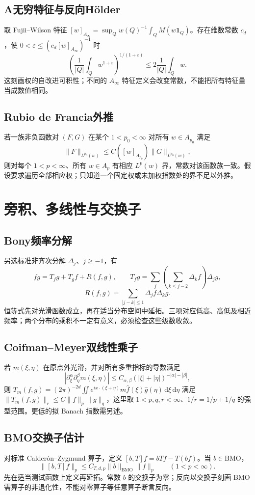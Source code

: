 \documentclass[../main.tex]{subfiles}
\begin{document}
\subsection{A无穷特征与反向Hölder}
取 Fujii--Wilson 特征 $[w]_{A_\infty}=\sup_Qw(Q)^{-1}\int_QM(w\bm1_Q)$。存在维数常数 $c_d$，使 $0<\varepsilon\le(c_d[w]_{A_\infty})^{-1}$ 时
\[
\left(\frac1{|Q|}\int_Qw^{1+\varepsilon}\right)^{1/(1+\varepsilon)}
\le2\frac1{|Q|}\int_Qw.
\]
这刻画权的自改进可积性；不同的 $A_\infty$ 特征定义会改变常数，不能把所有特征量当成数值相同。
\subsection{Rubio de Francia外推}
若一族非负函数对 $(F,G)$ 在某个 $1<p_0<\infty$ 对所有 $w\in A_{p_0}$ 满足
\[
\|F\|_{L^{p_0}(w)}\le C([w]_{A_{p_0}})\|G\|_{L^{p_0}(w)},
\]
则对每个 $1<p<\infty$、所有 $w\in A_p$ 有相应 $L^p(w)$ 界，常数对该函数族一致。假设要求遍历全部相应权；只知道一个固定权或未加权指数处的界不足以外推。
\section{旁积、多线性与交换子}
\subsection{Bony频率分解}
另选标准非齐次分解 $\Delta_j$、$j\ge-1$，有
\[
fg=T_fg+T_gf+R(f,g),\qquad
T_fg=\sum_j\left(\sum_{k\le j-2}\Delta_kf\right)\Delta_jg,
\]
\[
R(f,g)=\sum_{|j-k|\le1}\Delta_jf\Delta_kg.
\]
恒等式先对光滑函数成立，再在适当分布空间中延拓。三项对应低高、高低及相近频率；两个分布的乘积不一定有意义，必须检查这些级数收敛。
\subsection{Coifman--Meyer双线性乘子}
若 $m(\xi,\eta)$ 在原点外光滑，并对所有多重指标的导数满足
\[
|\partial_\xi^\alpha\partial_\eta^\beta m(\xi,\eta)|
\le C_{\alpha,\beta}(|\xi|+|\eta|)^{-|\alpha|-|\beta|},
\]
则 $T_m(f,g)=(2\pi)^{-2d}\iint e^{ix\cdot(\xi+\eta)}m\widehat f(\xi)\widehat g(\eta)\,\mathrm d\xi\,\mathrm d\eta$ 满足 $\|T_m(f,g)\|_r\le C\|f\|_p\|g\|_q$，这里取 $1<p,q,r<\infty$、$1/r=1/p+1/q$ 的强型范围。更低的拟 Banach 指数需另述。
\subsection{BMO交换子估计}
对标准 Calderón--Zygmund 算子，定义 $[b,T]f=bTf-T(bf)$。当 $b\in\mathrm{BMO}$，
\[
\|[b,T]f\|_p\le C_{T,d,p}\|b\|_{\mathrm{BMO}}\|f\|_p\qquad(1<p<\infty).
\]
先在适当测试函数上定义再延拓。常数 $b$ 的交换子为零；反向以交换子刻画 BMO 需算子的非退化性，不能对零算子等任意算子断言反向。
\end{document}
